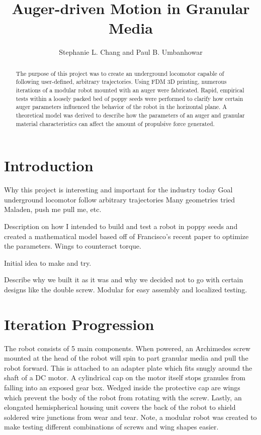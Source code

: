 \documentclass[letterpaper, 11 pt]{article}
\title{\Large \bf Auger-driven Motion in Granular Media}
\author{\centering Stephanie L. Chang and Paul B. Umbanhowar}
\begin{document}
\maketitle

\begin{abstract}
The purpose of this project was to create an underground locomotor capable of following user-defined, arbitrary trajectories. Using FDM 3D printing, numerous iterations of a modular robot mounted with an auger were fabricated. Rapid, empirical tests within a loosely packed bed of poppy seeds were performed to clarify how certain auger parameters influenced the behavior of the robot in the horizontal plane. A theoretical model was derived to describe how the parameters of an auger and granular material characteristics can affect the amount of propulsive force generated.   

\end{abstract}

\tableofcontents

\section{Introduction}

Why this project is interesting and important for the industry today
Goal underground locomotor follow arbitrary trajectories
Many geometries tried Maladen, push me pull me, etc. 

Description on how I intended to build and test a robot in poppy seeds and created a mathematical model based off of Francisco's recent paper to optimize the parameters.  
Wings to counteract torque.

Initial idea to make and try.

Describe why we built it as it was and why we decided not to go with certain designs like the double screw. Modular for easy assembly and localized testing. 

\section{Iteration Progression}

The robot consists of 5 main components. When powered, an Archimedes screw mounted at the head of the robot will spin to part granular media and pull the robot forward. This is attached to an adapter plate which fits snugly around the shaft of a DC motor. A cylindrical cap on the motor itself stops granules from falling into an exposed gear box. Wedged inside the protective cap are wings which prevent the body of the robot from rotating with the screw. Lastly, an elongated hemispherical housing unit covers the back of the robot to shield soldered wire junctions from wear and tear. Note, a modular robot was created to make testing different combinations of screws and wing shapes easier.
\end{document}
